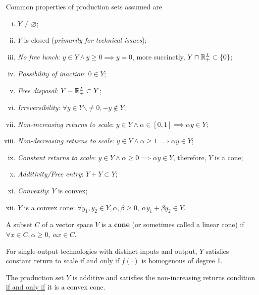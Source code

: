 \documentclass{report}
\begin{document}
	 		\begin{assumption}
	 			Common properties of production sets assumed are
	 			\begin{enumerate}[(i)]
	 				\item $Y \neq \varnothing$;
	 				\item $Y$ is closed (\emph{primarily for technical issues});
	 				\item \emph{No free lunch}: $y \in Y \land y \geq 0 \implies y = 0$, more succinctly, $Y \cap \mathbb{R}^L_+ \subset \{0\}$;
	 				\item \emph{Possibility of inaction}: $0 \in Y$;
	 				\item \emph{Free disposal}: $Y - \mathbb{R}^L_+ \subset Y$;
	 				\item \emph{Irreversibility}: $\forall y \in Y \backslash \neq 0, -y \notin Y$;
	 				\item \emph{Non-increasing returns to scale}: $y \in Y \land \alpha \in [0, 1] \implies  \alpha y \in Y$;
	 				\item \emph{Non-decreasing returns to scale}: $y \in Y \land \alpha \geq 1 \implies \alpha y \in Y$;
	 				\item \emph{Constant returns to scale}: $y \in Y \land \alpha \geq 0 \implies \alpha y \in Y$, therefore, $Y$ is a cone;
	 				\item \emph{Additivity/Free entry}: $Y + Y \subset Y$;
	 				\item \emph{Convexity}: $Y$ is convex;
	 				\item $Y$ is a convex cone: $\forall y_1, y_2 \in Y, \alpha, \beta \geq 0,\ \alpha y_1 + \beta y_2 \in Y$.
	 			\end{enumerate}
	 		\end{assumption}
	 		
	 		\begin{definition}
	 			A subset $C$ of a vector space $V$ is a \textbf{cone} (or sometimes called a linear cone) if $\forall x \in C, \alpha \geq 0,\ \alpha x \in C$.
	 		\end{definition}
	 		
	 		\begin{proposition}[Exercise 5.B.2]
	 			For single-output technologies with distinct inputs and output, $Y$ satisfies constant return to scale \ul{if and only if} $f(\cdot)$ is homogenous of degree 1.
	 		\end{proposition}
	 		
	 		\begin{proposition}[5.B.1]
	 			The production set $Y$ is additive and satisfies the non-increasing returns condition \ul{if and only if} it is a convex cone.
	 		\end{proposition}
	 		
\end{document}
